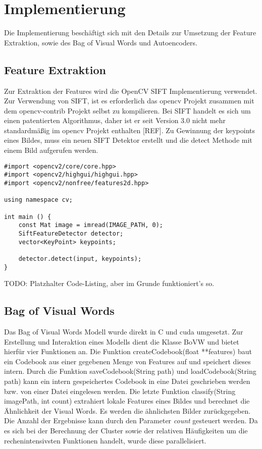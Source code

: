 \chapter{Implementierung}

Die Implementierung beschäftigt sich mit den Details zur Umsetzung der Feature Extraktion, sowie des Bag of Visual Words und Autoencoders.

\section{Feature Extraktion}

Zur Extraktion der Features wird die OpenCV SIFT Implementierung verwendet. Zur Verwendung von SIFT, ist es erforderlich das opencv Projekt zusammen mit dem opencv-contrib Projekt selbst zu kompilieren. Bei SIFT handelt es sich um einen patentierten Algorithmus, daher ist er seit Version 3.0 nicht mehr standardmäßig im opencv Projekt enthalten [REF]. Zu Gewinnung der keypoints eines Bildes, muss ein neuen SIFT Detektor erstellt und die detect Methode mit einem Bild aufgerufen werden.

\lstset{language=C}
\begin{lstlisting}
#import <opencv2/core/core.hpp>
#import <opencv2/highgui/highgui.hpp>
#import <opencv2/nonfree/features2d.hpp>

using namespace cv;

int main () {
	const Mat image = imread(IMAGE_PATH, 0);
	SiftFeatureDetector detector;
	vector<KeyPoint> keypoints;
	
	detector.detect(input, keypoints);
}
\end{lstlisting}

TODO: Platzhalter Code-Listing, aber im Grunde funktioniert's so.

\section{Bag of Visual Words}

Das Bag of Visual Words Modell wurde direkt in C und cuda umgesetzt. Zur Erstellung und Interaktion eines Modells dient die Klasse BoVW und bietet hierfür vier Funktionen an. Die Funktion createCodebook(float **features) baut ein Codebook aus einer gegebenen Menge von Features auf und speichert dieses intern. Durch die Funktion saveCodebook(String path) und loadCodebook(String path) kann ein intern gespeichertes Codebook in eine Datei geschrieben werden bzw. von einer Datei eingelesen werden. Die letzte Funktion classify(String imagePath, int count) extrahiert lokale Features eines Bildes und berechnet die Ähnlichkeit der Visual Words. Es werden die ähnlichsten Bilder zurückgegeben. Die Anzahl der Ergebnisse kann durch den Parameter \textit{count} gesteuert werden. 
Da es sich bei der Berechnung der Cluster sowie der relativen Häufigkeiten um die rechenintensivsten Funktionen handelt, wurde diese parallelisiert.

